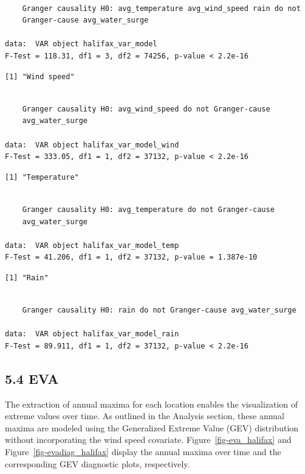 \documentclass[
  letterpaper,
  DIV=11,
  numbers=noendperiod]{scrartcl}
\begin{document}
\begin{verbatim}

    Granger causality H0: avg_temperature avg_wind_speed rain do not
    Granger-cause avg_water_surge

data:  VAR object halifax_var_model
F-Test = 118.31, df1 = 3, df2 = 74256, p-value < 2.2e-16
\end{verbatim}

\begin{verbatim}
[1] "Wind speed"
\end{verbatim}

\begin{verbatim}

    Granger causality H0: avg_wind_speed do not Granger-cause
    avg_water_surge

data:  VAR object halifax_var_model_wind
F-Test = 333.05, df1 = 1, df2 = 37132, p-value < 2.2e-16
\end{verbatim}

\begin{verbatim}
[1] "Temperature"
\end{verbatim}

\begin{verbatim}

    Granger causality H0: avg_temperature do not Granger-cause
    avg_water_surge

data:  VAR object halifax_var_model_temp
F-Test = 41.206, df1 = 1, df2 = 37132, p-value = 1.387e-10
\end{verbatim}

\begin{verbatim}
[1] "Rain"
\end{verbatim}

\begin{verbatim}

    Granger causality H0: rain do not Granger-cause avg_water_surge

data:  VAR object halifax_var_model_rain
F-Test = 89.911, df1 = 1, df2 = 37132, p-value < 2.2e-16
\end{verbatim}

\subsection{5.4 EVA}\label{eva}

The extraction of annual maxima for each location enables the
visualization of extreme values over time. As outlined in the Analysis
section, these annual maxima are modeled using the Generalized Extreme
Value (GEV) distribution without incorporating the wind speed covariate.
Figure~\ref{fig-eva_halifax} and Figure~\ref{fig-evadiag_halifax}
display the annual maxima over time and the corresponding GEV diagnostic
plots, respectively.
\end{document}
